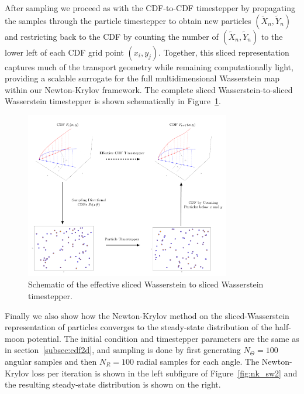 \documentclass{article}
\begin{document}
After sampling we proceed as with the CDF-to-CDF timestepper by propagating the samples through the particle timestepper to obtain new particles $(\tilde{X}_n,\tilde{Y}_n)$ and restricting back to the CDF by counting the number of $(\tilde{X}_n,\tilde{Y}_n)$ to the lower left of each CDF grid point $(x_i,y_j)$. Together, this sliced representation captures much of the transport geometry while remaining computationally light, providing a scalable surrogate for the full multidimensional Wasserstein map within our Newton-Krylov framework. The complete sliced Wasserstein-to-sliced Wasserstein timestepper is shown schematically in Figure~\ref{fig:swtosw}. 

\begin{figure}[!ht]
  \centering
  \includegraphics[width=0.8\textwidth]{SWtoSW.pdf}
  \caption{Schematic of the effective sliced Wasserstein to sliced Wasserstein timestepper.}
  \label{fig:swtosw}
\end{figure}

Finally we also show how the Newton-Krylov method on the sliced-Wasserstein representation of particles converges to the steady-state distribution of the half-moon potential. The initial condition and timestepper parameters are the same as in section~\ref{subsec:cdf2d}, and sampling is done by first generating $N_\Theta=100$ angular samples and then $N_R=100$ radial samples for each angle. The Newton-Krylov loss per iteration is shown in the left subfigure of Figure~\ref{fig:nk_sw2} and the resulting steady-state distribution is shown on the right.
\end{document}
